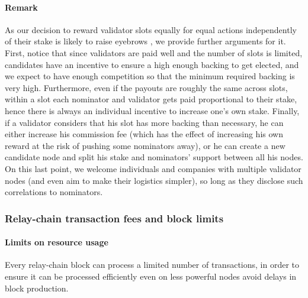 \paragraph{Remark} As our decision to reward validator slots equally for equal actions independently of their stake 
is likely to raise eyebrows , we provide further arguments for it. 
First, notice that since validators are paid well and the number of slots is limited, 
 candidates have an incentive to ensure a high enough backing to get elected, 
and we expect to have enough competition so that the minimum required backing is very high. 
Furthermore, even if the payouts are roughly the same across slots, within a slot each nominator and validator 
gets paid proportional to their stake, hence there is always an individual incentive to increase one's own stake. 
Finally, if a validator considers that his slot has more backing than necessary, he can either increase his 
commission fee (which has the effect of increasing his own reward at the risk of pushing some nominators away),
or he can create a new candidate node and split his stake and nominators' support between all his nodes. 
On this last point, we welcome individuals and companies with multiple validator nodes (and even aim to make their 
logistics simpler), so long as they disclose such correlations to nominators.


\subsubsection{Relay-chain transaction fees and block limits}

\paragraph{Limits on resource usage} Every relay-chain block can process a limited number of transactions, in order to ensure it can be processed efficiently even on less powerful nodes avoid delays in block production. 






